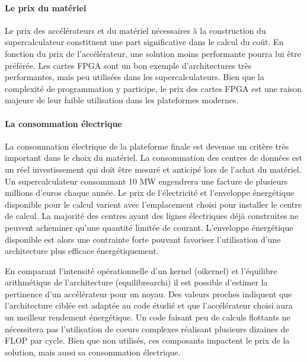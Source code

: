     \paragraph{Le prix du matériel} 
        Le  prix des accélérateurs et du matériel nécessaires à la construction du supercalculateur constituent une part significative dans le calcul du coût. En fonction du prix de l'accélérateur, une solution moins performante pourra lui être préférée. Les cartes FPGA sont un bon exemple d'architectures très performantes, mais peu utilisées dans les supercalculateurs. Bien que la complexité de programmation y participe, le prix des cartes FPGA est une raison majeure de leur faible utilisation dans les plateformes modernes.
    
    \paragraph{La consommation électrique}
        La consommation électrique de la plateforme finale est devenue un critère très important dans le choix du matériel. La consommation des centres de données est un réel investissement qui doit être mesuré et anticipé lors de l'achat du matériel. Un supercalculateur consommant 10 MW engendrera une facture de plusieurs millions d'euros chaque année. Le prix de l'électricité et l'enveloppe énergétique disponible pour le calcul varient avec l'emplacement choisi pour installer le centre de calcul. La majorité des centres ayant des lignes électriques déjà construites ne peuvent acheminer qu'une quantité limitée de courant. L'enveloppe énergétique disponible est alors une contrainte forte pouvant favoriser l'utilisation d'une architecture plus efficace énergétiquement.
        
        En comparant  l'intensité opérationnelle d'un kernel (\gls{oikernel}) et l'équilibre arithmétique de l'architecture (\gls{equilibrearchi}) il est possible d'estimer la pertinence d'un accélérateur pour un noyau. Des valeurs proches indiquent que l'architecture ciblée est adaptée au code étudié et que l'accélérateur choisi aura un meilleur rendement énergétique. Un code faisant peu de calculs flottants ne nécessitera pas l'utilisation de coeurs complexes réalisant plusieurs dizaines de \gls{FLOP} par cycle. Bien que non utilisés, ces composants impactent le prix de la solution, mais aussi sa consommation électrique. 
        
            
